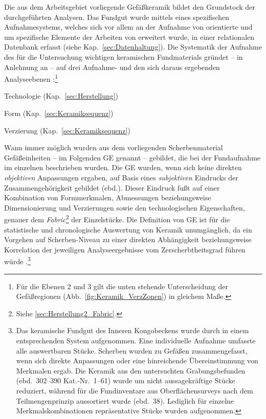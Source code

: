 \begin{multicols}{2}
Die aus dem Arbeitsgebiet vorliegende Gefäßkeramik bildet den Grundstock der durchgeführten Analysen. Das Fundgut wurde mittels eines spezifischen Aufnahmesystems, welches sich vor allem an der Aufnahme von \textcite{Wotzka.1995} orientierte und um spezifische Elemente der Arbeiten von \textcites{Nordstrom.1972}{Stehli.1973}{Keding.1997}{Jesse.2003}{Clist.20042005} erweitert wurde, in einer relationalen Datenbank erfasst (siehe Kap.~\ref{sec:Datenhaltung}). Die Systematik der Aufnahme des für die Untersuchung wichtigen keramischen Fundmaterials gründet -- in Anlehnung an \textcite[57\,f.]{Stehli.1973} -- auf drei Aufnahme- und den sich daraus ergebenden Analyseebenen \parencite[siehe][36]{Keding.1997}:\footnote{Für die Ebenen 2 und 3 gilt die unten stehende Unterscheidung der Gefäßregionen (Abb.~\ref{fig:Keramik_VerzZonen}) in gleichem Maße.}
\begin{enumerate*}
	\item Technologie (Kap.~\ref{sec:Herstellung})
	\item Form (Kap.~\ref{sec:Keramiksequenz})
	\item Verzierung (Kap.~\ref{sec:Keramiksequenz})
\end{enumerate*}

\noindent Wann immer möglich wurden aus dem vorliegenden Scherbenmaterial Gefäßeinheiten -- im Folgenden GE genannt \parencite[siehe][81]{Jesse.2003} -- gebildet, die bei der Fundaufnahme im einzelnen beschrieben wurden. Die GE wurden, wenn sich keine direkten \textit{objektiven} Anpassungen ergaben, auf Basis eines \textit{subjektiven} Eindrucks der Zusammengehörigkeit gebildet (ebd.). Dieser Eindruck fußt auf einer Kombination von Formmerkmalen, Abmessungen beziehungsweise Dimensionierung und Verzierungen sowie den technologischen Eigenschaften, genauer dem \textit{Fabric}\footnote{Siehe \ref{sec:Herstellung2_Fabric}.} der Einzelstücke. Die Definition von GE ist für die statistische und chronologische Auswertung von Keramik unumgänglich, da ein Vorgehen auf Scherben-Niveau zu einer direkten Abhängigkeit beziehungsweise Korrelation der jeweiligen Analyseergebnisse vom Zerscherbtheitsgrad führen würde \parencites[siehe][36\,f.]{Keding.1997}[nach][483]{Drew.1988}.\footnote{Das keramische Fundgut des Inneren Kongobeckens wurde durch \textcite[38]{Wotzka.1995} in einem entsprechenden System aufgenommen. Eine individuelle Aufnahme umfasste alle auswertbaren Stücke. Scherben wurden zu Gefäßen zusammengefasst, wenn sich direkte Anpassungen oder eine hinreichende Übereinstimmung von Merkmalen ergab. Die Keramik aus den untersuchten Grabungsbefunden (ebd.~302--390 Kat.-Nr.~1--61) wurde um nicht aussagekräftige Stücke reduziert, während für die Fundinventare aus Oberflächensurveys nach dem Teilmengenprinzip aussortiert wurde (ebd.~38). Lediglich für einzelne Merkmalskombinationen repräsentative Stücke wurden aufgenommen.}


\end{multicols}
